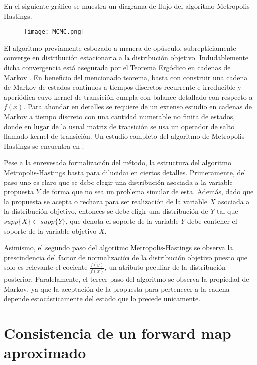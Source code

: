En el siguiente gráfico se muestra un diagrama de flujo del algoritmo Metropolis-Hastings.

\begin{figure}[H] 
    \centering 
    \texttt{[image: MCMC.png]} 
    \label{Fig. M-H}
\end{figure} 

El algoritmo previamente esbozado a manera de opúsculo, subrepticiamente converge en distribución estacionaria a la distribución objetivo. Indudablemente dicha convergencia está asegurada por el Teorema Ergódico en cadenas de Markov \cite{norris1998markov}. En beneficio del mencionado teorema, basta con construir una cadena de Markov de estados continuos a tiempos discretos recurrente e irreducible y aperiódica cuyo kernel de transición cumpla con balance detallado con respecto a $f(x)$. Para ahondar en detalles se requiere de un extenso estudio en cadenas de Markov a tiempo discreto con una cantidad numerable no finita de estados, donde en lugar de la usual matriz de transición se usa un operador de salto llamado kernel de transición. Un estudio completo del algoritmo de Metropolis-Hastings se encuentra en \cite{mengersen1996rates}.

Pese a la enrevesada formalización del método, la estructura del algoritmo Metropolis-Hastings basta para dilucidar en ciertos detalles. Primeramente, del paso uno es claro que se debe elegir una distribución asociada a la variable propuesta $Y$ de forma que no sea un problema simular de esta. Además, dado que la propuesta se acepta o rechaza para ser realización de la variable $X$ asociada a la distribución objetivo, entonces se debe eligir una distribución de $Y$ tal que $supp\{X\} \subset supp\{Y\}$, que denota el soporte de la variable $Y$ debe contener el soporte de la variable objetivo $X$.

Asimismo, el segundo paso del algoritmo Metropolis-Hastings se observa la prescindencia del factor de normalización de la distribución objetivo puesto que solo es relevante el cociente $\frac{f(y)}{f(x)}$, un atributo peculiar de la distribución posterior. Paralelamente, el tercer paso del algoritmo se observa la propiedad de Markov, ya que la aceptación de la propuesta para pertenecer a la cadena depende estocásticamente del estado que lo precede unicamente.

\section{Consistencia de un forward map aproximado}


